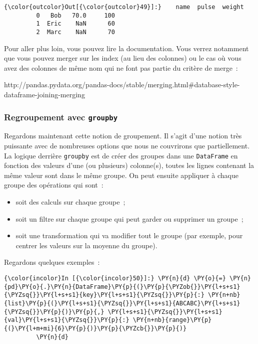 \begin{Verbatim}[commandchars=\\\{\},frame=single,framerule=0.3mm,rulecolor=\color{cellframecolor}]
{\color{outcolor}Out[{\color{outcolor}49}]:}    name  pulse  weight
         0   Bob   70.0     100
         1  Eric    NaN      60
         2  Marc    NaN      70
\end{Verbatim}
            
    Pour aller plus loin, vous pouvez lire la documentation. Vous verrez
notamment que vous pouvez merger sur les index (au lieu des colonnes) ou
le cas où vous avez des colonnes de même nom qui ne font pas partie du
critère de merge~:

http://pandas.pydata.org/pandas-docs/stable/merging.html\#database-style-dataframe-joining-merging

    \hypertarget{regroupement-avec-groupby}{%
\subsubsection{\texorpdfstring{Regroupement avec
\texttt{groupby}}{Regroupement avec groupby}}\label{regroupement-avec-groupby}}

    Regardons maintenant cette notion de groupement. Il s'agit d'une notion
très puissante avec de nombreuses options que nous ne couvrirons que
partiellement. La logique derrière \texttt{groupby} est de créer des
groupes dans une \texttt{DataFrame} en fonction des valeurs d'une (ou
plusieurs) colonne(s), toutes les lignes contenant la même valeur sont
dans le même groupe. On peut ensuite appliquer à chaque groupe des
opérations qui sont~:

\begin{itemize}
\tightlist
\item
  soit des calculs sur chaque groupe~;
\item
  soit un filtre sur chaque groupe qui peut garder ou supprimer un
  groupe~;
\item
  soit une transformation qui va modifier tout le groupe (par exemple,
  pour centrer les valeurs sur la moyenne du groupe).
\end{itemize}

Regardons quelques exemples~:

    \begin{Verbatim}[commandchars=\\\{\},frame=single,framerule=0.3mm,rulecolor=\color{cellframecolor}]
{\color{incolor}In [{\color{incolor}50}]:} \PY{n}{d} \PY{o}{=} \PY{n}{pd}\PY{o}{.}\PY{n}{DataFrame}\PY{p}{(}\PY{p}{\PYZob{}}\PY{l+s+s1}{\PYZsq{}}\PY{l+s+s1}{key}\PY{l+s+s1}{\PYZsq{}}\PY{p}{:} \PY{n+nb}{list}\PY{p}{(}\PY{l+s+s1}{\PYZsq{}}\PY{l+s+s1}{ABCABC}\PY{l+s+s1}{\PYZsq{}}\PY{p}{)}\PY{p}{,} \PY{l+s+s1}{\PYZsq{}}\PY{l+s+s1}{val}\PY{l+s+s1}{\PYZsq{}}\PY{p}{:} \PY{n+nb}{range}\PY{p}{(}\PY{l+m+mi}{6}\PY{p}{)}\PY{p}{\PYZcb{}}\PY{p}{)}
         \PY{n}{d}
\end{Verbatim}



